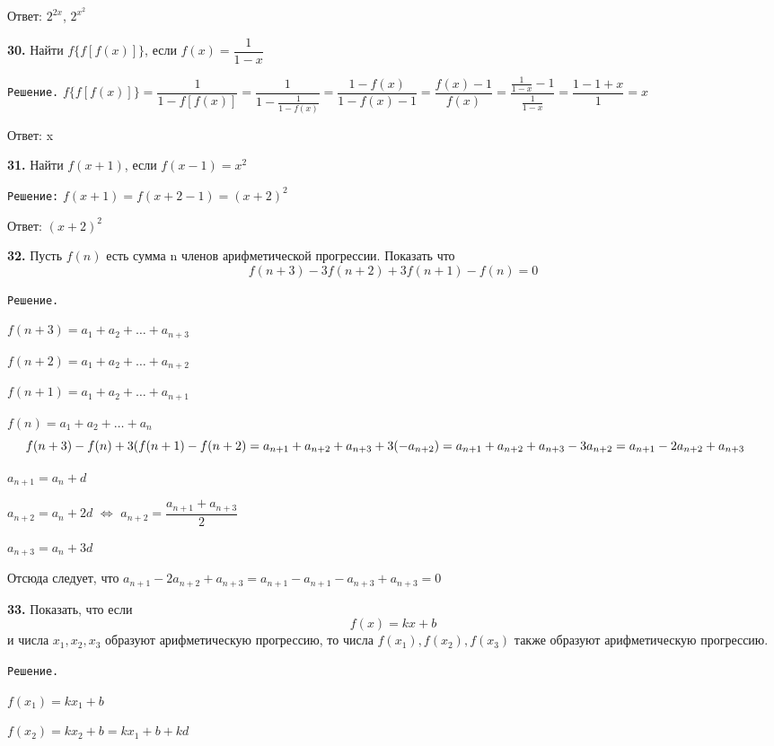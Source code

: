 \documentclass[12pt]{article}
\begin{document}
	\hspace{-3mm}Ответ: $2^{2x}$, $2^{x^2}$
	
	{\bf 30.} Найти $f\{f[f(x)]\}$, если $f(x) =\dfrac{1}{1-x}$
	
	{\tt Решение.} $f\{f[f(x)]\} = \dfrac{1}{1-f[f(x)]} = \dfrac{1}{1-\frac{1}{1-f(x)}} = \dfrac{1-f(x)}{1-f(x)-1} = \dfrac{f(x)-1}{f(x)} = \dfrac{\frac{1}{1-x}-1}{\frac{1}{1-x}} = \dfrac{1-1+x}{1} = x$\vspace{2mm}
	
	\hspace{-3mm} Ответ: x\vspace{2mm}
	
	{\bf 31.} Найти $f(x+1)$, если $f(x-1)=x^2$
	
	{\tt Решение:} $f(x+1) = f(x+2-1) = (x+2)^2$
	
	\hspace{-3mm} Ответ: $(x+2)^2$	\vspace{2mm}
	
	{\bf 32.} Пусть $f(n)$ есть сумма n членов арифметической прогрессии.
	 Показать что
	 \[
		 f(n+3)-3f(n+2)+3f(n+1) -f(n) =0
	 \]
	 
	 {\tt Решение.}
	 
	 $f(n+3) = a_1+a_2+\dots+a_{n+3}$
	 
	 $f(n+2) = a_1+a_2+\dots+a_{n+2}$
	 
	 $f(n+1) = a_1+a_2+\dots+a_{n+1}$
	 
	 $f(n) = a_1+a_2+\dots+a_n$
	\[
		\hspace{-4.5mm}f(n+3)-f(n)+3(f(n+1)-f(n+2) = a_{n+1}+a_{n+2}+a_{n+3}+3(-a_{n+2}) = a_{n+1}+a_{n+2}+a_{n+3}-3a_{n+2} =a_{n+1}-2a_{n+2}+a_{n+3}
	\]
	
	$a_{n+1} = a_n+d$
	
	$a_{n+2} = a_n+2d$ \quad$\Leftrightarrow$ $a_{n+2} = \dfrac{a_{n+1}+a_{n+3}}{2}$

	$a_{n+3} = a_n+3d$
	
	\hspace{-3mm}Отсюда следует, что $a_{n+1}-2a_{n+2}+a_{n+3} = a_{n+1}-a_{n+1}-a_{n+3}+a_{n+3} = 0$
	\vspace{2mm}
	
	{\bf 33.} Показать, что если 
	\[
		f(x) = kx+b
	\] и числа $x_1,x_2,x_3$ образуют арифметическую прогрессию, то числа $f(x_1),f(x_2), f(x_3)$ также образуют арифметическую прогрессию.
	
	{\tt Решение.}
	
	$f(x_1) = kx_1+b$
	
	$f(x_2) = kx_2+b = kx_1+b+kd$
	
\end{document}
